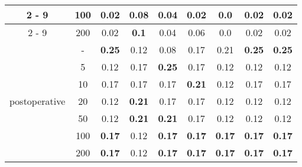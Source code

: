 \documentclass{article}%
\begin{document}
\begin{longtable}{c|c|ccccccc}
\cline{2%
-%
9}%
&100&0.02&\textbf{0.08}&0.04&0.02&0.0&0.02&0.02\\%
\cline{2%
-%
9}%
&200&0.02&\textbf{0.1}&0.04&0.06&0.0&0.02&0.02\\%
\hline%
\multirow{7}{*}{postoperative}&{-}&\textbf{0.25}&0.12&0.08&0.17&0.21&\textbf{0.25}&\textbf{0.25}\\%
\cline{2%
-%
9}%
&5&0.12&0.17&\textbf{0.25}&0.17&0.12&0.12&0.12\\%
\cline{2%
-%
9}%
&10&0.17&0.17&0.17&\textbf{0.21}&0.12&0.17&0.17\\%
\cline{2%
-%
9}%
&20&0.12&\textbf{0.21}&0.17&0.17&0.12&0.12&0.12\\%
\cline{2%
-%
9}%
&50&0.12&\textbf{0.21}&\textbf{0.21}&0.17&0.12&0.12&0.12\\%
\cline{2%
-%
9}%
&100&\textbf{0.17}&0.12&\textbf{0.17}&\textbf{0.17}&\textbf{0.17}&\textbf{0.17}&\textbf{0.17}\\%
\cline{2%
-%
9}%
&200&\textbf{0.17}&0.12&\textbf{0.17}&\textbf{0.17}&\textbf{0.17}&\textbf{0.17}&\textbf{0.17}\\%
\hline%
\end{longtable}

%
\end{document}
